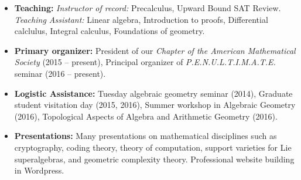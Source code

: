 \documentclass[10pt,a4paper]{article}
\begin{document}
\begin{itemize}
\item \textbf{Teaching:} \emph{Instructor of record:} Precalculus, Upward Bound SAT Review. \emph{Teaching Assistant:} Linear algebra, Introduction to proofs, Differential calclulus, Integral calculus, Foundations of geometry.
\item \textbf{Primary organizer:} President of our \emph{Chapter of the American Mathematical Society} (2015 -- present), Principal organizer of \emph{P.E.N.U.L.T.I.M.A.T.E.} seminar (2016 -- present).
\item \textbf{Logistic Assistance:} Tuesday algebraic geometry seminar (2014), Graduate student visitation day (2015, 2016), Summer workshop in Algebraic Geometry (2016), Topological Aspects of Algebra and Arithmetic Geometry (2016).
\item \textbf{Presentations:} Many presentations on mathematical disciplines such as cryptography, coding theory, theory of computation, support varieties for Lie superalgebras, and geometric complexity theory. Professional website building in Wordpress. 
\end{itemize}
\end{document}
